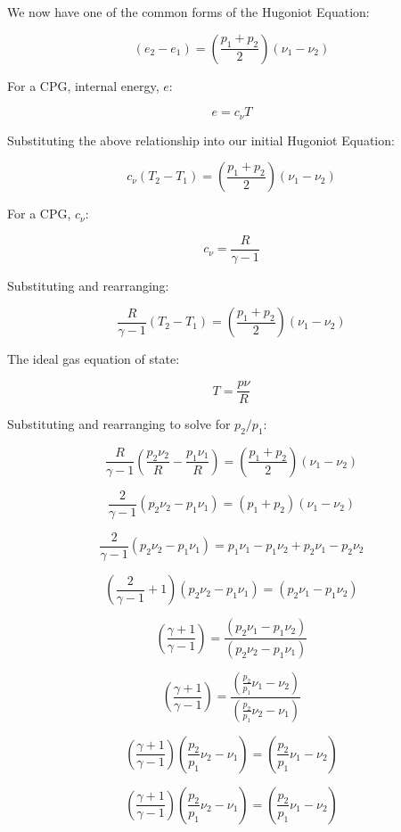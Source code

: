 \documentclass[../main.tex]{subfiles}
\begin{document}
We now have one of the common forms of the Hugoniot Equation:

\[
    \left({e_2 - e_1}\right) =
    \left({\frac{p_1 + p_2}{2}}\right)
    \left({\nu_1 - \nu_2}\right)
\]

For a CPG, internal energy, \(e\):

\[
    e = c_\nu T
\]   

Substituting the above relationship into our initial Hugoniot Equation:

\[
    c_\nu \left({T_2 - T_1}\right) =
    \left({\frac{p_1 + p_2}{2}}\right)
    \left({\nu_1 - \nu_2}\right)
\]

For a CPG, \(c_\nu\):

\[
    c_\nu = \frac{R}{\gamma-1}
\] 

Substituting and rearranging:

\[
    \frac{R}{\gamma-1} \left({T_2 - T_1}\right) =
    \left({\frac{p_1 + p_2}{2}}\right)
    \left({\nu_1 - \nu_2}\right)
\]

The ideal gas equation of state:

\[
    T = \frac{p \nu}{R}
\]    

Substituting and rearranging to solve for \(p_2/p_1\):

\[
    \frac{R}{\gamma-1} \left({\frac{p_2 \nu_2}{R} - \frac{p_1 \nu_1}{R}}\right) =
    \left({\frac{p_1 + p_2}{2}}\right)
    \left({\nu_1 - \nu_2}\right)
\]

\[
    \frac{2}{\gamma-1} \left({p_2 \nu_2 - p_1 \nu_1}\right) =
    \left({p_1 + p_2}\right)
    \left({\nu_1 - \nu_2}\right)
\]

\[
    \frac{2}{\gamma-1} \left({p_2 \nu_2 - p_1 \nu_1}\right) =
    p_1 \nu_1 - p_1 \nu_2 + p_2 \nu_1 - p_2 \nu_2
\]

\[
    \left({\frac{2}{\gamma-1} + 1}\right) \left({p_2 \nu_2 - p_1 \nu_1}\right) =
    \left({p_2 \nu_1 - p_1 \nu_2}\right)
\]

\[
    \left({\frac{\gamma+1}{\gamma-1}}\right)  =
    \frac{\left({p_2 \nu_1 - p_1 \nu_2}\right)}
    {\left({p_2 \nu_2 - p_1 \nu_1}\right)}
\]

\[
    \left({\frac{\gamma+1}{\gamma-1}}\right)  =
    \frac{\left({\frac{p_2}{p_1} \nu_1 - \nu_2}\right)}
    {\left({\frac{p_2}{p_1} \nu_2 - \nu_1}\right)}
\]

\[
    \left({\frac{\gamma+1}{\gamma-1}}\right) {\left({\frac{p_2}{p_1} \nu_2 - \nu_1}\right)}  =
    \left({\frac{p_2}{p_1} \nu_1 - \nu_2}\right)
\]

\[
    \left({\frac{\gamma+1}{\gamma-1}}\right) {\left({\frac{p_2}{p_1} \nu_2 - \nu_1}\right)}  =
    \left({\frac{p_2}{p_1} \nu_1 - \nu_2}\right)
\]
\end{document}
